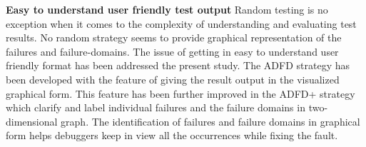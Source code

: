 \textbf{Easy to understand user friendly test output}
Random testing is no exception when it comes to the complexity of understanding and evaluating test results. No random strategy seems to provide graphical representation of the failures and failure-domains. The issue of getting in easy to understand user friendly format has been addressed the present study. The ADFD strategy has been developed with the feature of giving the result output in the visualized graphical form. This feature has been further improved in the ADFD+ strategy which clarify and label individual failures and the failure domains in two-dimensional graph. The identification of failures and failure domains in graphical form helps debuggers keep in view all the occurrences while fixing the fault.  \\





